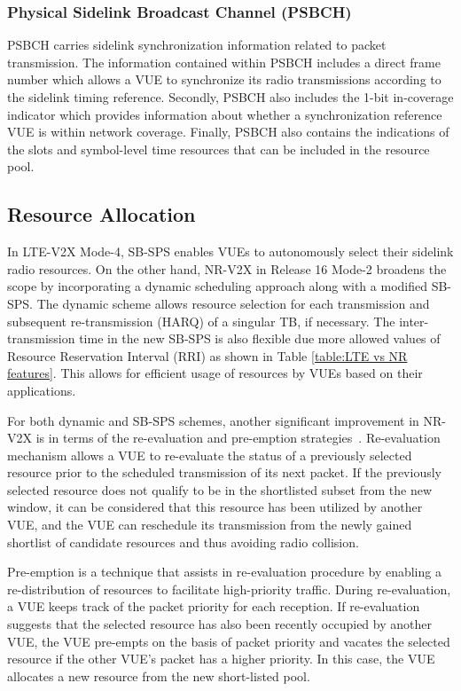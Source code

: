 \documentclass[iicol]{sn-jnl}%
\theoremstyle{thmstyleone}%
\theoremstyle{thmstyletwo}%
\theoremstyle{thmstylethree}%
\begin{document}
\subsubsection{Physical Sidelink Broadcast Channel (PSBCH)}
PSBCH carries sidelink synchronization information
related to packet transmission. The information contained
within PSBCH includes a direct frame number which
allows a VUE to synchronize its radio transmissions
according to the sidelink timing reference. Secondly,
PSBCH also includes the 1-bit in-coverage indicator
which provides information about whether a
synchronization reference VUE is within network
coverage. Finally, PSBCH also contains the indications of
the slots and symbol-level time resources that can be
included in the resource pool.

\subsection{Resource Allocation}\label{subsec7.2}
In LTE-V2X Mode-4, SB-SPS enables VUEs to autonomously select their sidelink radio resources. On the other hand, NR-V2X in Release 16 Mode-2 broadens the scope by incorporating a dynamic scheduling approach along with a modified SB-SPS. The dynamic scheme allows resource selection for each transmission and subsequent re-transmission (HARQ) of a singular TB, if necessary. The inter-transmission time in the new SB-SPS is also flexible due more allowed values of Resource Reservation Interval (RRI) as shown in Table \ref{table:LTE vs NR features}. This allows for efficient usage of resources by VUEs based on their applications.

For both dynamic and SB-SPS schemes, another significant improvement in NR-V2X is in terms of the re-evaluation and pre-emption strategies~\cite{NR:phy, molina2022does}. Re-evaluation mechanism allows a VUE to re-evaluate the status of a previously selected resource prior to the scheduled transmission of its next packet. If the previously selected resource does not qualify to be in the shortlisted subset from the new window, it can be considered that this resource has been utilized by another VUE, and the VUE can reschedule its transmission from the newly gained shortlist of candidate resources and thus avoiding radio collision.

Pre-emption is a technique that assists in re-evaluation procedure by enabling a re-distribution of resources to facilitate high-priority traffic. During re-evaluation, a VUE keeps track of the packet priority for each reception. If re-evaluation suggests that the selected resource has also been recently occupied by another VUE, the VUE pre-empts on the basis of packet priority and vacates the selected resource if the other VUE’s packet has a higher priority. In this case, the VUE allocates a new resource from the new short-listed pool.
\end{document}
